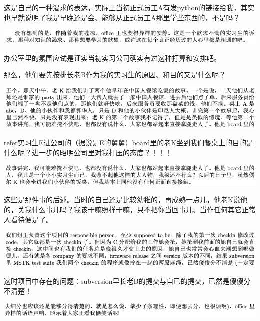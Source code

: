 \documentclass[9pt, b5paper]{article}
\begin{document}
这是自己的一种渴求的表达，实际上当初正式员工A有发python的链接给我，其实也早就说明了我是早晚还是会、能够从正式员工A那里学些东西的，不是吗？

\begin{center}
\includegraphics[width=.9\linewidth]{./pic/backups_plans_20210507_104827.png}
\end{center}

办公室里的氛围应试是证实当初实习公司确实有过这种打算和安排吧。 

那么，他们要先按排长老B作为我的实习生的原因、和目的又是什么呢？

\begin{center}
\includegraphics[width=.9\linewidth]{./pic/backups_plans_20210507_105100.png}
\end{center}

refer实习生E进公司的（据说是E的舅舅）board里的老K坐到我们餐桌上的目的是什么呢？进一步的昭明公司里对我打压的态度？！！！

\begin{center}
\includegraphics[width=.9\linewidth]{./pic/backups_plans_20210507_105255.png}
\end{center}

这些是那件事的后述。当时的自已还是比较幼稚的，再成熟一点儿，他老K说他的，关我什么事儿吗？我该干嘛照样干嘛，只不把你当回事儿、当作任何其它正常人看待便是了。 

\begin{center}
\includegraphics[width=.9\linewidth]{./pic/backups_plans_20210507_093941.png}
\end{center}

这时项目中存在的问题：subversion里长老B的提交与自已的提交，已然是傻傻分不清楚！

\begin{center}
\includegraphics[width=.9\linewidth]{./pic/backups_plans_20210507_094042.png}
\end{center}
\end{document}
